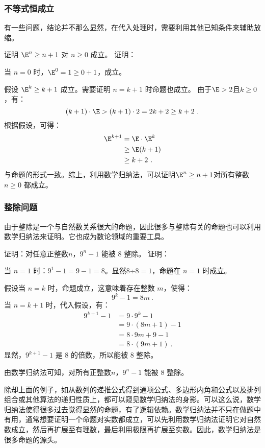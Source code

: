 \subsubsection{不等式恒成立}

有一些问题，结论并不那么显然，在代入处理时，需要利用其他已知条件来辅助放缩。

\begin{example}{证明 $\E^n \geq n+1$ 对 $n \geq 0$ 成立。}
证明：

当 $n = 0$ 时，$\E^0 = 1\geq 0+1$，成立。

假设 $\E^k \geq k+1$ 成立。需要证明 $n = k+1$ 时命题也成立。
由于$\E>2$且$k\geq0$，有：
\begin{equation}
(k + 1) \cdot \E > (k + 1) \cdot 2 = 2k + 2 \geq k + 2~.
\end{equation}
根据假设，可得：
\begin{equation}
\begin{aligned}
\E^{k+1} &= \E \cdot \E^k\\
&\geq \E(k+1)\\
&\geq k+2~.
\end{aligned}
\end{equation}
与命题的形式一致。综上，利用数学归纳法，可以证明$\E^n \geq n+1$对所有整数$n \geq 0$ 都成立。
\end{example}

\subsubsection{整除问题}

由于整除是一个与自然数关系很大的命题，因此很多与整除有关的命题也可以利用数学归纳法来证明。它也成为数论领域的重要工具。

\begin{example}{证明：对任意正整数$n$，$9^{n} - 1$ 能被 $8$ 整除。}
证明：

当 $n = 1$ 时：$9^1 - 1 = 9 - 1 = 8$。显然$8\text{÷}8=1$，命题在 $n = 1$ 时成立。

假设当 $n = k$ 时，命题成立，这意味着存在整数 $m$，使得：
\begin{equation}
9^k - 1 = 8m~.
\end{equation}
当 $n = k+1$ 时，代入假设，有：
\begin{equation}
\begin{aligned}
9^{k+1} - 1 &= 9\cdot9^{k} - 1\\
&= 9\cdot(8m+1)- 1\\
&= 8\cdot9m+9- 1\\
&= 8\cdot(9m+1)~.
\end{aligned}
\end{equation}
显然，$9^{k+1} - 1$ 是 $8$ 的倍数，所以能被 $8$ 整除。

由数学归纳法可知，对所有正整数$n$，$9^{n} - 1$ 能被 $8$ 整除。
\end{example}
除却上面的例子，如从数列的递推公式得到通项公式、多边形内角和公式以及排列组合或其他算法的递归性质上，都可以窥见数学归纳法的身影。可以这么说，数学归纳法使得很多过去觉得显然的命题，有了逻辑依赖。数学归纳法并不只在做题中有用，通常想要证明一个命题对实数都成立，可以先利用数学归纳法证明它对自然数成立，然后再扩展至有理数，最后利用极限再扩展至实数。因此，数学归纳法是很多命题的源头。

